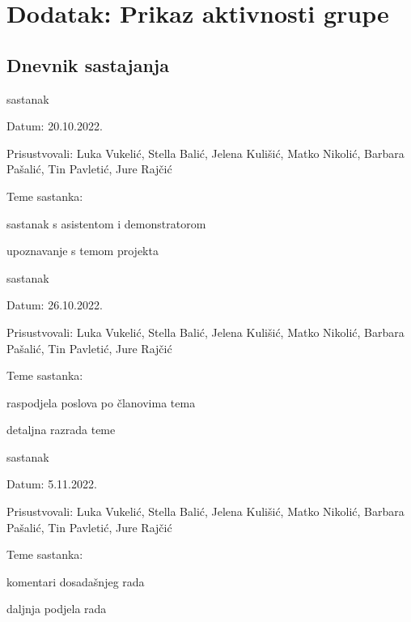 \chapter*{Dodatak: Prikaz aktivnosti grupe}
		
		\section*{Dnevnik sastajanja}
		
		\begin{packed_enum}
			\item  sastanak
			
			\item[] \begin{packed_item}
				\item Datum: 20.10.2022.
				\item Prisustvovali: Luka Vukelić, Stella Balić, Jelena Kulišić, Matko Nikolić, Barbara Pašalić, Tin Pavletić, Jure Rajčić
				\item Teme sastanka:
				\begin{packed_item}
					\item  sastanak s asistentom i demonstratorom
					\item  upoznavanje s temom projekta
				\end{packed_item}
			\end{packed_item}
			
			\item  sastanak
			\item[] \begin{packed_item}
				\item Datum: 26.10.2022.
				\item Prisustvovali: Luka Vukelić, Stella Balić, Jelena Kulišić, Matko Nikolić, Barbara Pašalić, Tin Pavletić, Jure Rajčić
				\item Teme sastanka:
				\begin{packed_item}
					\item  raspodjela poslova po članovima tema
					\item  detaljna razrada teme
				\end{packed_item}
			\end{packed_item}
		 
		 \item  sastanak
		 \item[] \begin{packed_item}
		 	\item Datum: 5.11.2022.
		 	\item Prisustvovali: Luka Vukelić, Stella Balić, Jelena Kulišić, Matko Nikolić, Barbara Pašalić, Tin Pavletić, Jure Rajčić
		 	\item Teme sastanka:
		 	\begin{packed_item}
		 		\item  komentari dosadašnjeg rada
		 		\item  daljnja podjela rada
		 	\end{packed_item}
		 \end{packed_item}
	 

\end{packed_enum}
